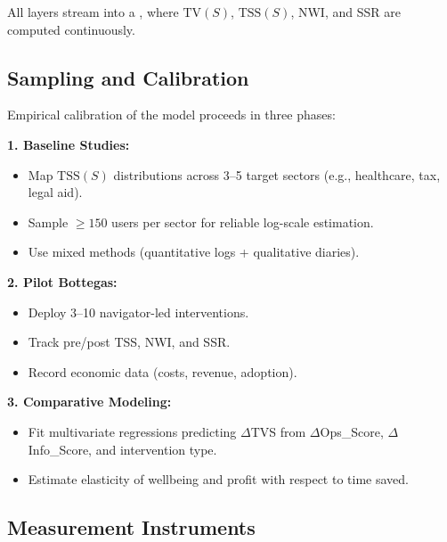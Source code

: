 All layers stream into a , where $\text{TV}(S)$, $\text{TSS}(S)$, NWI, and SSR are computed continuously.

\subsection{Sampling and Calibration}
\label{sec:sampling-calibration}

Empirical calibration of the model proceeds in three phases:

\textbf{1. Baseline Studies:}
\begin{itemize}
    \item Map $\text{TSS}(S)$ distributions across 3–5 target sectors (e.g., healthcare, tax, legal aid).
    \item Sample $\geq 150$ users per sector for reliable log-scale estimation.
    \item Use mixed methods (quantitative logs + qualitative diaries).
\end{itemize}

\textbf{2. Pilot Bottegas:}
\begin{itemize}
    \item Deploy 3–10 navigator-led interventions.
    \item Track pre/post TSS, NWI, and SSR.
    \item Record economic data (costs, revenue, adoption).
\end{itemize}

\textbf{3. Comparative Modeling:}
\begin{itemize}
    \item Fit multivariate regressions predicting $\Delta$TVS from $\Delta$Ops\_Score, $\Delta$Info\_Score, and intervention type.
    \item Estimate elasticity of wellbeing and profit with respect to time saved.
\end{itemize}

\subsection{Measurement Instruments}
\label{sec:measurement-instruments}

